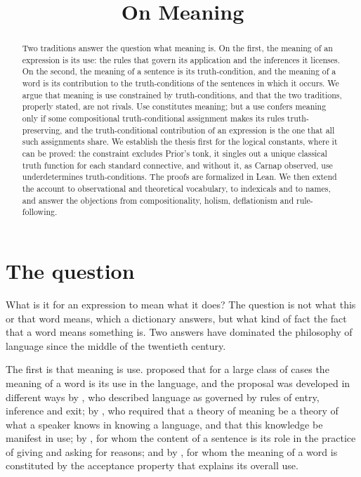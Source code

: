 \documentclass{situationist-preprint}
\title{On Meaning}
\begin{document}
\maketitle

\begin{abstract}
Two traditions answer the question what meaning is. On the first, the meaning of an expression is its use: the rules that govern its application and the inferences it licenses. On the second, the meaning of a sentence is its truth-condition, and the meaning of a word is its contribution to the truth-conditions of the sentences in which it occurs. We argue that meaning is use constrained by truth-conditions, and that the two traditions, properly stated, are not rivals. Use constitutes meaning; but a use confers meaning only if some compositional truth-conditional assignment makes its rules truth-preserving, and the truth-conditional contribution of an expression is the one that all such assignments share. We establish the thesis first for the logical constants, where it can be proved: the constraint excludes Prior's tonk, it singles out a unique classical truth function for each standard connective, and without it, as Carnap observed, use underdetermines truth-conditions. The proofs are formalized in Lean. We then extend the account to observational and theoretical vocabulary, to indexicals and to names, and answer the objections from compositionality, holism, deflationism and rule-following.
\end{abstract}

\section{The question}

What is it for an expression to mean what it does? The question is not what this or that word means, which a dictionary answers, but what kind of fact the fact that a word means something is. Two answers have dominated the philosophy of language since the middle of the twentieth century.

The first is that meaning is use. \citet[\S43]{Wittgenstein1953} proposed that for a large class of cases the meaning of a word is its use in the language, and the proposal was developed in different ways by \citet{Sellars1954}, who described language as governed by rules of entry, inference and exit; by \citet{Dummett1975,Dummett1991}, who required that a theory of meaning be a theory of what a speaker knows in knowing a language, and that this knowledge be manifest in use; by \citet{Brandom1994}, for whom the content of a sentence is its role in the practice of giving and asking for reasons; and by \citet{Horwich1998}, for whom the meaning of a word is constituted by the acceptance property that explains its overall use.
\end{document}
